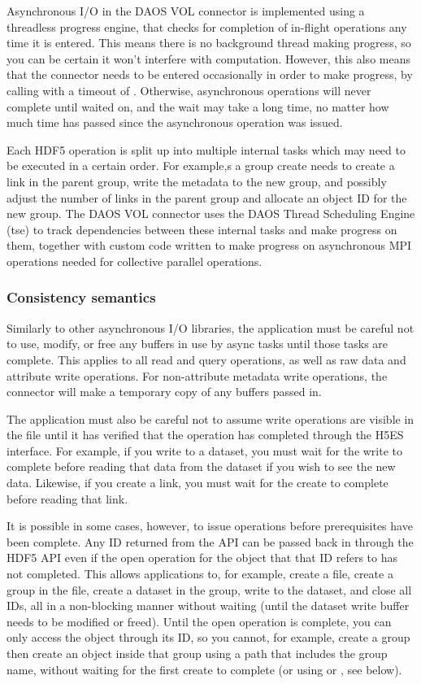 \documentclass[../users_guide.tex]{subfiles}
\begin{document}
Asynchronous I/O in the DAOS VOL connector is implemented using a threadless
progress engine, that checks for completion of in-flight operations any time it
is entered. This means there is no background thread making progress, so you can
be certain it won't interfere with computation. However, this also means that
the connector needs to be entered occasionally in order to make progress, by
calling  with a timeout of . Otherwise,
asynchronous operations will never complete until waited on, and the wait may
take a long time, no matter how much time has passed since the asynchronous
operation was issued.

Each HDF5 operation is split up into multiple internal tasks which may need to
be executed in a certain order. For example,s a group create needs to create a
link in the parent group, write the metadata to the new group, and possibly
adjust the number of links in the parent group and allocate an object ID for the
new group. The DAOS VOL connector uses the DAOS Thread Scheduling Engine (tse)
to track dependencies between these internal tasks and make progress on them,
together with custom code written to make progress on asynchronous MPI
operations needed for collective parallel operations.

\subsubsection {Consistency semantics}

Similarly to other asynchronous I/O libraries, the application must be careful
not to use, modify, or free any buffers in use by async tasks until those tasks
are complete. This applies to all read and query operations, as well as raw data
and attribute write operations.  For non-attribute metadata write operations,
the connector will make a temporary copy of any buffers passed in.

The application must also be careful not to assume write operations are visible
in the file until it has verified that the operation has completed through the
H5ES interface. For example, if you write to a dataset, you must wait for the
write to complete before reading that data from the dataset if you wish to see
the new data. Likewise, if you create a link, you must wait for the create to
complete before reading that link.

It is possible in some cases, however, to issue operations before prerequisites
have been complete. Any ID returned from the API can be passed back in through
the HDF5 API even if the open operation for the object that that ID refers to
has not completed. This allows applications to, for example, create a file,
create a group in the file, create a dataset in the group, write to the dataset,
and close all IDs, all in a non-blocking manner without waiting (until the
dataset write buffer needs to be modified or freed). Until the open operation is
complete, you can only access the object through its ID, so you cannot, for
example, create a group then create an object inside that group using a path
that includes the group name, without waiting for the first create to complete
(or using  or , see
below).
\end{document}
